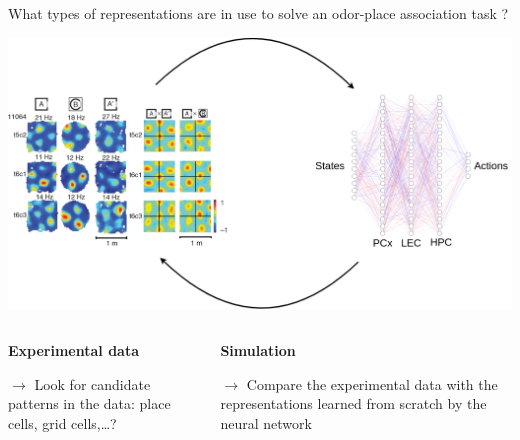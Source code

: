 \documentclass[bigger]{beamer}
\begin{document}
\begin{frame}[label={sec:org770dfa8}]{What types of representations are in use to solve an odor-place association task ?}
\begin{center}
\includegraphics[height=0.4\textheight]{img/exp-vs-simu.drawio.png}
\end{center}
\vspace{-3em}
\begin{columns}
\begin{column}[t]{0.5\columnwidth}
\begin{center}
\textbf{Experimental data}
\end{center}
\(\to\) Look for candidate patterns in the data: place cells, grid cells,\dots{}?
\end{column}
\begin{column}[t]{0.5\columnwidth}
\begin{center}
\textbf{Simulation}
\end{center}
\(\to\) Compare the experimental data with the representations learned from scratch by the neural network

\end{column}
\end{columns}
\end{frame}
\end{document}
